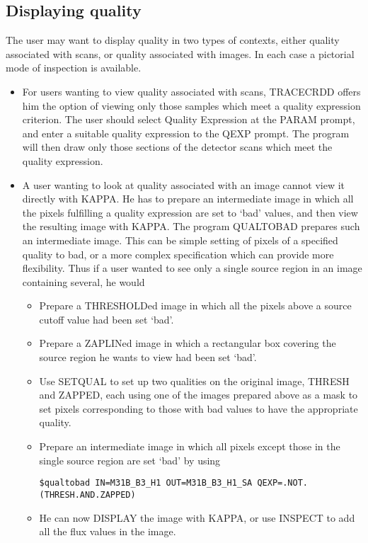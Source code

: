 \subsection{Displaying quality}
The user may want to display quality in two types of contexts, either quality
associated with scans, or quality associated with images. In each case a
pictorial mode of inspection is available.
\begin{itemize}
\item For users wanting to view quality associated with scans, TRACECRDD offers 
him the option of viewing only those samples which meet a quality expression 
criterion. The user should select Quality Expression at the PARAM prompt, and
enter a suitable quality expression to the QEXP prompt. The program will then 
draw only those sections of the detector scans which meet the quality 
expression.
\item A user wanting to look at quality associated with an image cannot view it
directly with KAPPA. He has to prepare an intermediate image in which all the
pixels fulfilling a quality expression are set to `bad' values, and
then view the resulting image with KAPPA. The program QUALTOBAD prepares such an
intermediate image. This can be simple setting of pixels of a specified quality
to bad, or a more complex specification which can provide more flexibility. Thus
if a user wanted to see only a single source region in an image containing
several, he would
\begin{itemize}
\item Prepare a THRESHOLDed image in which all the pixels above a source cutoff
value had been set `bad'.
\item Prepare a ZAPLINed image in which a rectangular box covering the source 
region he wants to view had been set `bad'.
\item Use SETQUAL to set up two qualities on the original image, THRESH and 
ZAPPED, each using one of the images prepared above as a mask to set pixels 
corresponding to those with bad values to have the appropriate quality.
\item Prepare an intermediate image in which all pixels except those in the 
single source region are set `bad'  by using
\begin{small}
\begin{verbatim}
$qualtobad IN=M31B_B3_H1 OUT=M31B_B3_H1_SA QEXP=.NOT.(THRESH.AND.ZAPPED)
\end{verbatim}
\end{small}
\item He can now DISPLAY the image with KAPPA, or use INSPECT to add all the 
flux values in the image.
\end{itemize}
\end{itemize}
